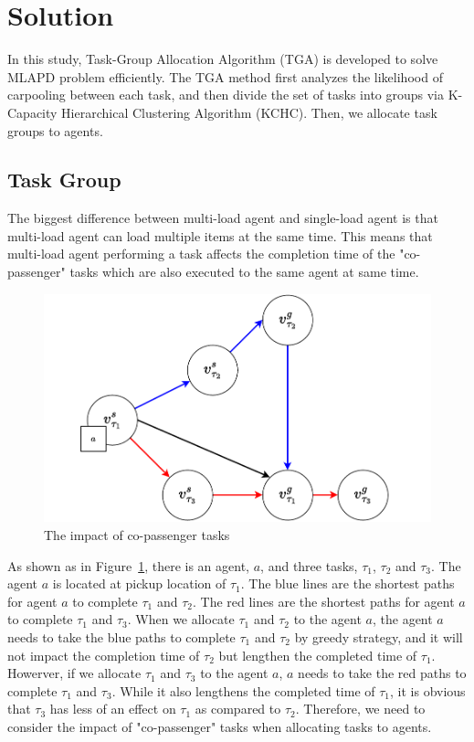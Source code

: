 \documentclass[sigconf,anonymous]{aamas}
\begin{document}
\section{Solution}

In this study, Task-Group Allocation Algorithm (TGA) is developed to solve MLAPD problem efficiently. 
The TGA method first analyzes the likelihood of carpooling between each task, 
and then divide the set of tasks into groups via K-Capacity Hierarchical Clustering Algorithm (KCHC). 
Then, we allocate task groups to agents.

\subsection{Task Group}
The biggest difference between multi-load agent and single-load agent 
is that multi-load agent can load multiple items at the same time. 
This means that multi-load agent performing a task affects the completion time of the "co-passenger" tasks 
which are also executed to the same agent at same time.
\begin{figure}[ht]
  \centering
  \includegraphics[width=0.5\linewidth]{Fig/carpooling.pdf}
  \caption{The impact of co-passenger tasks}
  \label{fig:carpooling}
\end{figure}

\begin{example}
As shown as in Figure~\ref{fig:carpooling}, there is an agent, $a$, 
and three tasks, $\tau_{1}$, $\tau_{2}$ and $\tau_{3}$.
The agent $a$ is located at pickup location of $\tau_{1}$.
The blue lines are the shortest paths for agent $a$ to complete $\tau_{1}$ and $\tau_{2}$.
The red lines are the shortest paths for agent $a$ to complete $\tau_{1}$ and $\tau_{3}$.
When we allocate $\tau_{1}$ and $\tau_{2}$ to the agent $a$,
the agent $a$ needs to take the blue paths to complete $\tau_{1}$ and $\tau_{2}$ by greedy strategy,
and it will not impact the completion time of $\tau_{2}$ but lengthen the completed time of $\tau_{1}$.
Howerver, if we allocate $\tau_{1}$ and $\tau_{3}$ to the agent $a$, 
$a$ needs to take the red paths to complete $\tau_{1}$ and $\tau_{3}$.
While it also lengthens the completed time of $\tau_{1}$, 
it is obvious that $\tau_3$ has less of an effect on $\tau_1$ as compared to $\tau_{2}$.
Therefore, we need to consider the impact of "co-passenger" tasks when allocating tasks to agents.
\end{example}
\end{document}
